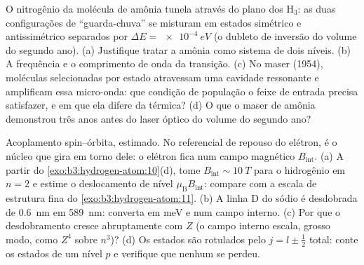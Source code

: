 \begin{exercise}[$\star\star$]\label{exo:b3:spin-two-level:9}
O nitrogênio da molécula de amônia tunela através do plano dos H$_3$:
as duas configurações de ``guarda-chuva'' se misturam em estados
simétrico e antissimétrico separados por $\Delta E = \qty{e-4}{eV}$ (o
dubleto de inversão do volume do segundo ano). (a) Justifique tratar a
amônia como sistema de dois níveis. (b) A frequência e o comprimento de
onda da transição. (c) No maser (1954), moléculas selecionadas por
estado atravessam uma cavidade ressonante e amplificam essa micro-onda:
que condição de população o feixe de entrada precisa satisfazer, e em
que ela difere da térmica? (d) O que o maser de amônia demonstrou três
anos antes do laser óptico do volume do segundo ano?
\end{exercise}

\begin{exercise}[$\star\star\star$]\label{exo:b3:spin-two-level:10}
Acoplamento spin--órbita, estimado. No referencial de repouso do
elétron, é o núcleo que gira em torno dele: o elétron fica num campo
magnético $B_{\text
{int}}$. (a) A partir do \cref{exo:b3:hydrogen-atom:10}(d), tome
$B_{\text{int}} \sim \qty{10}{T}$ para o hidrogênio em $n = 2$ e estime
o deslocamento de nível $\mu_{\text{B}}B_{\text{int}}$: compare com a
escala de estrutura fina do \cref{exo:b3:hydrogen-atom:11}. (b) A
linha D do sódio é desdobrada de \qty{0.6}{nm} em \qty{589}{nm}:
converta em meV e num campo interno. (c) Por que o desdobramento cresce
abruptamente com $Z$ (o campo interno escala, grosso modo, como $Z^4$
sobre $n^3$)?
(d) Os estados são rotulados pelo $j = l \pm \tfrac12$ total: conte os
estados de um nível $p$ e verifique que nenhum se perdeu.
\end{exercise}

